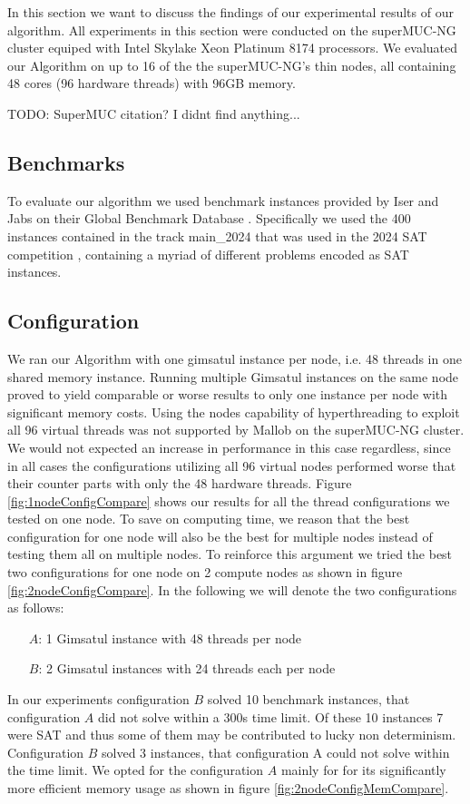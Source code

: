 \documentclass[12pt,a4paper,twoside]{scrartcl}
\numberwithin{equation}{section}
\begin{document}
In this section we want to discuss the findings of our experimental results of our algorithm. All experiments in this section were conducted on the superMUC-NG cluster equiped with Intel Skylake Xeon Platinum 8174 processors. We evaluated our Algorithm on up to 16 of the the superMUC-NG's thin nodes, all containing 48 cores (96 hardware threads) with 96GB memory.

TODO: SuperMUC citation? I didnt find anything...

\subsection{Benchmarks}
To evaluate our algorithm we used benchmark instances provided by Iser and Jabs on their Global Benchmark Database \cite{benchmarkDB}. Specifically we used the 400 instances contained in the track main\_2024 that was used in the 2024 SAT competition \cite{satComp2024}, containing a myriad of different problems encoded as SAT instances.

\subsection{Configuration}
We ran our Algorithm with one gimsatul instance per node, i.e. 48 threads in one shared memory instance. Running multiple Gimsatul instances on the same node proved to yield comparable or worse results to only one instance per node with significant memory costs. Using the nodes capability of hyperthreading to exploit all 96 virtual threads was not supported by Mallob on the superMUC-NG cluster. We would not expected an increase in performance in this case regardless, since in all cases the configurations utilizing all 96 virtual nodes performed worse that their counter parts with only the 48 hardware threads. Figure \ref{fig:1nodeConfigCompare} shows our results for all the thread configurations we tested on one node. To save on computing time, we reason that the best configuration for one node will also be the best for multiple nodes instead of testing them all on multiple nodes. To reinforce this argument we tried the best two configurations for one node on 2 compute nodes as shown in figure \ref{fig:2nodeConfigCompare}. In the following we will denote the two configurations as follows:
\begin{itemize}
  \item[$A$:] 1 Gimsatul instance with 48 threads per node
  \item[$B$:] 2 Gimsatul instances with 24 threads each per node
\end{itemize}
In our experiments configuration $B$ solved 10 benchmark instances, that configuration $A$ did not solve within a 300s time limit. Of these 10 instances 7 were SAT and thus some of them may be contributed to lucky non determinism. Configuration $B$ solved 3 instances, that configuration A could not solve within the time limit. We opted for the configuration $A$ mainly for for its significantly more efficient memory usage as shown in figure \ref{fig:2nodeConfigMemCompare}.
\end{document}
